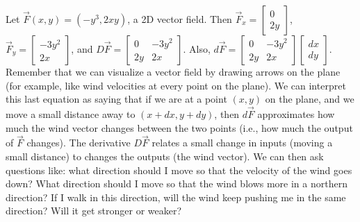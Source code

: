 \begin{example}
  Let $\vec F(x,y)=(-y^3,2xy)$, a 2D vector field.  Then $\vec F_x=\begin{bmatrix}0\\2y\end{bmatrix}$, $\vec F_y=\begin{bmatrix}-3y^2\\2x\end{bmatrix}$, and $D\vec F = \begin{bmatrix}0&-3y^2\\2y&2x\end{bmatrix}$.  Also, $d\vec F=\begin{bmatrix}0&-3y^2\\2y&2x\end{bmatrix}\begin{bmatrix}dx\\dy\end{bmatrix}$.  Remember that we can visualize a vector field by drawing arrows on the plane (for example, like wind velocities at every point on the plane).  We can interpret this last equation as saying that if we are at a point $(x,y)$ on the plane, and we move a small distance away to $(x+dx, y+dy)$, then $d\vec F$ approximates how much the wind vector changes between the two points (i.e., how much the output of $\vec F$ changes).  The derivative $D\vec F$ relates a small change in inputs (moving a small distance) to changes the outputs (the wind vector).  We can then ask questions like: what direction should I move so that the velocity of the wind goes down?  What direction should I move so that the wind blows more in a northern direction?  If I walk in this direction, will the wind keep pushing me in the same direction?  Will it get stronger or weaker?  
\end{example}

